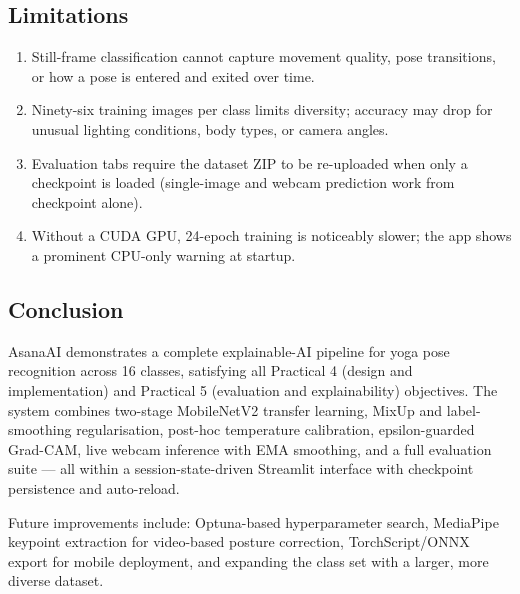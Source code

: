\documentclass[12pt,a4paper]{article}
\begin{document}
\subsection{Limitations}
\begin{enumerate}[leftmargin=1.5em, label=\textbf{L\arabic*.}, itemsep=1pt]
  \item Still-frame classification cannot capture movement quality, pose transitions,
    or how a pose is entered and exited over time.
  \item Ninety-six training images per class limits diversity; accuracy may drop for
    unusual lighting conditions, body types, or camera angles.
  \item Evaluation tabs require the dataset ZIP to be re-uploaded when only a checkpoint
    is loaded (single-image and webcam prediction work from checkpoint alone).
  \item Without a CUDA GPU, 24-epoch training is noticeably slower; the app shows a
    prominent CPU-only warning at startup.
\end{enumerate}

\subsection{Conclusion}
AsanaAI demonstrates a complete explainable-AI pipeline for yoga pose recognition
across 16 classes, satisfying all Practical 4 (design and implementation) and
Practical 5 (evaluation and explainability) objectives. The system combines two-stage
MobileNetV2 transfer learning, MixUp and label-smoothing regularisation, post-hoc
temperature calibration, epsilon-guarded Grad-CAM, live webcam inference with EMA
smoothing, and a full evaluation suite — all within a session-state-driven Streamlit
interface with checkpoint persistence and auto-reload.

Future improvements include: Optuna-based hyperparameter search, MediaPipe keypoint
extraction for video-based posture correction, TorchScript/ONNX export for mobile
deployment, and expanding the class set with a larger, more diverse dataset.
\end{document}
